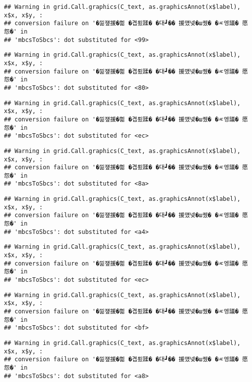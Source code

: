\documentclass[
]{article}
\begin{document}
\begin{verbatim}
## Warning in grid.Call.graphics(C_text, as.graphicsAnnot(x$label), x$x, x$y, :
## conversion failure on '�낆쟾援�쁾 �곕룄蹂� �대┛�� 援먰넻�ш퀬� �ㅼ엥議� 愿怨�' in
## 'mbcsToSbcs': dot substituted for <99>
\end{verbatim}

\begin{verbatim}
## Warning in grid.Call.graphics(C_text, as.graphicsAnnot(x$label), x$x, x$y, :
## conversion failure on '�낆쟾援�쁾 �곕룄蹂� �대┛�� 援먰넻�ш퀬� �ㅼ엥議� 愿怨�' in
## 'mbcsToSbcs': dot substituted for <80>
\end{verbatim}

\begin{verbatim}
## Warning in grid.Call.graphics(C_text, as.graphicsAnnot(x$label), x$x, x$y, :
## conversion failure on '�낆쟾援�쁾 �곕룄蹂� �대┛�� 援먰넻�ш퀬� �ㅼ엥議� 愿怨�' in
## 'mbcsToSbcs': dot substituted for <ec>
\end{verbatim}

\begin{verbatim}
## Warning in grid.Call.graphics(C_text, as.graphicsAnnot(x$label), x$x, x$y, :
## conversion failure on '�낆쟾援�쁾 �곕룄蹂� �대┛�� 援먰넻�ш퀬� �ㅼ엥議� 愿怨�' in
## 'mbcsToSbcs': dot substituted for <8a>
\end{verbatim}

\begin{verbatim}
## Warning in grid.Call.graphics(C_text, as.graphicsAnnot(x$label), x$x, x$y, :
## conversion failure on '�낆쟾援�쁾 �곕룄蹂� �대┛�� 援먰넻�ш퀬� �ㅼ엥議� 愿怨�' in
## 'mbcsToSbcs': dot substituted for <a4>
\end{verbatim}

\begin{verbatim}
## Warning in grid.Call.graphics(C_text, as.graphicsAnnot(x$label), x$x, x$y, :
## conversion failure on '�낆쟾援�쁾 �곕룄蹂� �대┛�� 援먰넻�ш퀬� �ㅼ엥議� 愿怨�' in
## 'mbcsToSbcs': dot substituted for <ec>
\end{verbatim}

\begin{verbatim}
## Warning in grid.Call.graphics(C_text, as.graphicsAnnot(x$label), x$x, x$y, :
## conversion failure on '�낆쟾援�쁾 �곕룄蹂� �대┛�� 援먰넻�ш퀬� �ㅼ엥議� 愿怨�' in
## 'mbcsToSbcs': dot substituted for <bf>
\end{verbatim}

\begin{verbatim}
## Warning in grid.Call.graphics(C_text, as.graphicsAnnot(x$label), x$x, x$y, :
## conversion failure on '�낆쟾援�쁾 �곕룄蹂� �대┛�� 援먰넻�ш퀬� �ㅼ엥議� 愿怨�' in
## 'mbcsToSbcs': dot substituted for <a8>
\end{verbatim}
\end{document}
